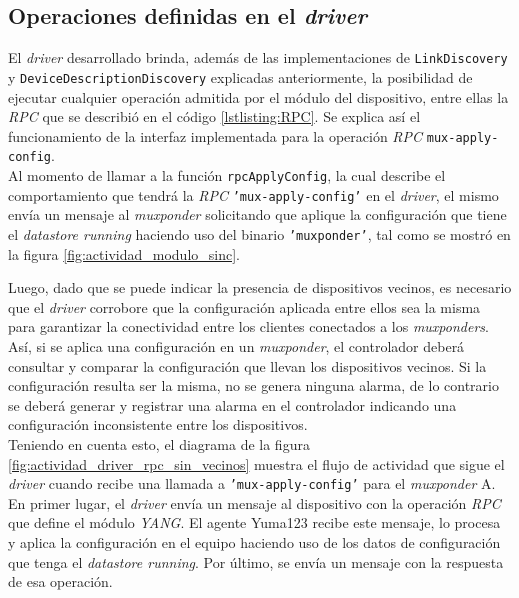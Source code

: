   \subsection{Operaciones definidas en el \textit{driver}} \label{drivermux}

  El \textit{driver} desarrollado brinda, además de las implementaciones de \texttt{LinkDiscovery} y \texttt{DeviceDescriptionDiscovery} explicadas anteriormente, la posibilidad de ejecutar cualquier operación admitida por el módulo del dispositivo, entre ellas la \textit{RPC} que se describió en el código \ref{lstlisting:RPC}. Se explica así el funcionamiento de la interfaz implementada para la operación \textit{RPC} \texttt{mux-apply-config}. 
  \\

  Al momento de llamar a la función \texttt{rpcApplyConfig}, la cual describe el comportamiento que tendrá la \textit{RPC} \texttt{'mux-apply-config'} en el \textit{driver}, el mismo envía un mensaje al \textit{muxponder} solicitando que aplique la configuración que tiene el \textit{datastore running} haciendo uso del binario \texttt{'muxponder'}, tal como se mostró en la figura \ref{fig:actividad_modulo_sinc}.
  
  Luego, dado que se puede indicar la presencia de dispositivos vecinos, es necesario que el \textit{driver} corrobore que la configuración aplicada entre ellos sea la misma para garantizar la conectividad entre los clientes conectados a los \textit{muxponders}. Así, si se aplica una configuración en un \textit{muxponder}, el controlador deberá consultar y comparar la configuración que llevan los dispositivos vecinos. Si la configuración resulta ser la misma, no se genera ninguna alarma, de lo contrario se deberá generar y registrar una alarma en el controlador indicando una configuración inconsistente entre los dispositivos.
  \\

  Teniendo en cuenta esto, el diagrama de la figura \ref{fig:actividad_driver_rpc_sin_vecinos} muestra el flujo de actividad que sigue el \textit{driver} cuando recibe una llamada a \texttt{'mux-apply-config'} para el \textit{muxponder} A. 
  En primer lugar, el \textit{driver} envía un mensaje al dispositivo con la operación \textit{RPC} que define el módulo \textit{YANG}. El agente Yuma123 recibe este mensaje, lo procesa y aplica la configuración en el equipo haciendo uso de los datos de configuración que tenga el \textit{datastore running}. Por último, se envía un mensaje con la respuesta de esa operación.  

